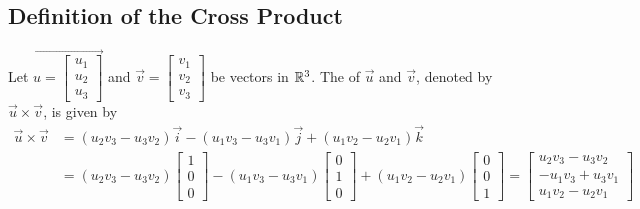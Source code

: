 \documentclass{ximera}
\begin{document}
\subsection*{Definition of the Cross Product}
 
\begin{definition}\label{def:crossproduct} Let $\vec{u=\begin{bmatrix}u_1\\u_2\\u_3\end{bmatrix}}$ and $\vec{v}=\begin{bmatrix}v_1\\v_2\\v_3\end{bmatrix}$ be vectors in $\mathbb{R}^3$.  The  of $\vec{u}$ and $\vec{v}$, denoted by $\vec{u}\times\vec{v}$, is given by
\begin{align*}
\vec{u}\times\vec{v}&=(u_2v_3-u_3v_2)\vec{i}-(u_1v_3-u_3v_1)\vec{j}+(u_1v_2-u_2v_1)\vec{k} \\
&=(u_2v_3-u_3v_2)\begin{bmatrix}1\\0\\0\end{bmatrix}-(u_1v_3-u_3v_1)\begin{bmatrix}0\\1\\0\end{bmatrix}+(u_1v_2-u_2v_1)\begin{bmatrix}0\\0\\1\end{bmatrix}=\begin{bmatrix}u_2v_3-u_3v_2\\-u_1v_3+u_3v_1\\u_1v_2-u_2v_1\end{bmatrix}
\end{align*}
\end{definition}
 
\end{document}
